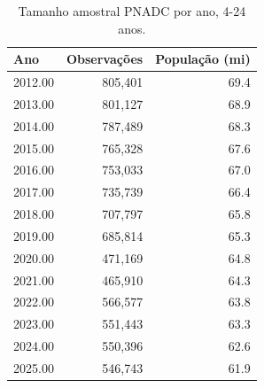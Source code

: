 \begin{table}[htbp]
\centering
\caption{Tamanho amostral PNADC por ano, 4-24 anos.}
\label{tab:ap_a1_amostra}
\small
\begin{tabular}{lrr}
\toprule
Ano & Observações & População (mi) \\
\midrule
2012.00 & 805,401 & 69.4 \\
2013.00 & 801,127 & 68.9 \\
2014.00 & 787,489 & 68.3 \\
2015.00 & 765,328 & 67.6 \\
2016.00 & 753,033 & 67.0 \\
2017.00 & 735,739 & 66.4 \\
2018.00 & 707,797 & 65.8 \\
2019.00 & 685,814 & 65.3 \\
2020.00 & 471,169 & 64.8 \\
2021.00 & 465,910 & 64.3 \\
2022.00 & 566,577 & 63.8 \\
2023.00 & 551,443 & 63.3 \\
2024.00 & 550,396 & 62.6 \\
2025.00 & 546,743 & 61.9 \\
\bottomrule
\end{tabular}
\end{table}
